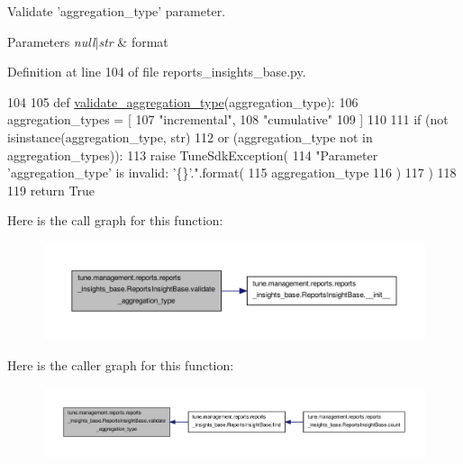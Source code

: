 Validate 'aggregation\-\_\-type' parameter. 


\begin{DoxyParams}{Parameters}
{\em null$\vert$str} & format \\
\hline
\end{DoxyParams}


Definition at line 104 of file reports\-\_\-insights\-\_\-base.\-py.


\begin{DoxyCode}
104 
105     \textcolor{keyword}{def }\hyperlink{classtune_1_1management_1_1reports_1_1reports__insights__base_1_1ReportsInsightBase_a21b9eb499a7eb17b2a9bb887d4490688}{validate\_aggregation\_type}(aggregation\_type):
106         aggregation\_types = [
107             \textcolor{stringliteral}{"incremental"},
108             \textcolor{stringliteral}{"cumulative"}
109             ]
110 
111         \textcolor{keywordflow}{if} (\textcolor{keywordflow}{not} isinstance(aggregation\_type, str)
112             \textcolor{keywordflow}{or} (aggregation\_type \textcolor{keywordflow}{not} \textcolor{keywordflow}{in} aggregation\_types)):
113             \textcolor{keywordflow}{raise} TuneSdkException(
114                 \textcolor{stringliteral}{"Parameter 'aggregation\_type' is invalid: '\{\}'."}.format(
115                 aggregation\_type
116                 )
117             )
118 
119         \textcolor{keywordflow}{return} \textcolor{keyword}{True}

\end{DoxyCode}


Here is the call graph for this function\-:
\nopagebreak
\begin{figure}[H]
\begin{center}
\leavevmode
\includegraphics[width=350pt]{classtune_1_1management_1_1reports_1_1reports__insights__base_1_1ReportsInsightBase_a21b9eb499a7eb17b2a9bb887d4490688_cgraph}
\end{center}
\end{figure}




Here is the caller graph for this function\-:
\nopagebreak
\begin{figure}[H]
\begin{center}
\leavevmode
\includegraphics[width=350pt]{classtune_1_1management_1_1reports_1_1reports__insights__base_1_1ReportsInsightBase_a21b9eb499a7eb17b2a9bb887d4490688_icgraph}
\end{center}
\end{figure}


